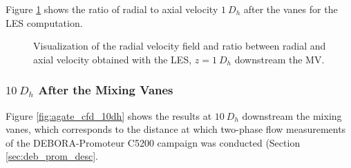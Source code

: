\npar

Figure \ref{fig:ur_s_ua_1dh} shows the ratio of radial to axial velocity $1~D_{h}$ after the vanes for the LES computation.

\begin{figure}
\caption{Visualization of the radial velocity field and ratio between radial and axial velocity obtained with the LES, $z=1~D_{h}$ downstream the MV.}
\label{fig:ur_s_ua_1dh}
\end{figure}



\npar


\subsubsection{$10\ D_{h}$ After the Mixing Vanes}

Figure \ref{fig:agate_cfd_10dh} shows the results at $10\ D_{h}$ downstream the mixing vanes, which corresponds to the distance at which two-phase flow measurements of the DEBORA-Promoteur C5200 campaign was conducted (Section \ref{sec:deb_prom_desc}.

